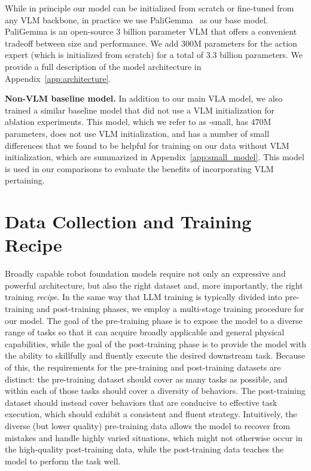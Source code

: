 While in principle our model can be initialized from scratch or fine-tuned from any VLM backbone, in practice we use PaliGemma~\citep{beyer2024paligemma} as our base model. PaliGemma is an open-source 3 billion parameter VLM that offers a convenient tradeoff between size and performance. We add 300M parameters for the action expert (which is initialized from scratch) for a total of 3.3 billion parameters. We provide a full description of the model architecture in Appendix~\ref{app:architecture}.

\noindent \textbf{Non-VLM baseline model.} In addition to our main VLA model, we also trained a similar baseline model that did not use a VLM initialization for ablation experiments. This model, which we refer to as \ModelSymbol-small, has 470M parameters, does not use VLM initialization, and has a number of small differences that we found to be helpful for training on our data without VLM initialization, which are summarized in Appendix~\ref{app:small_model}. This model is used in our comparisons to evaluate the benefits of incorporating VLM pertaining.

\section{Data Collection and Training Recipe}
\label{sec:recipe}

Broadly capable robot foundation models require not only an expressive and powerful architecture, but also the right dataset and, more importantly, the right training \emph{recipe}. In the same way that LLM training is typically divided into pre-training and post-training phases, we employ a multi-stage training procedure for our model. The goal of the pre-training phase is to expose the model to a diverse range of tasks so that it can acquire broadly applicable and general physical capabilities, while the goal of the post-training phase is to provide the model with the ability to skillfully and fluently execute the desired downstream task. Because of this, the requirements for the pre-training and post-training datasets are distinct: the pre-training dataset should cover as many tasks as possible, and within each of those tasks should cover a diversity of behaviors. The post-training dataset should instead cover behaviors that are conducive to effective task execution, which should exhibit a consistent and fluent strategy. Intuitively, the diverse (but lower quality) pre-training data allows the model to recover from mistakes and handle highly varied situations, which might not otherwise occur in the high-quality post-training data, while the post-training data teaches the model to perform the task well.

